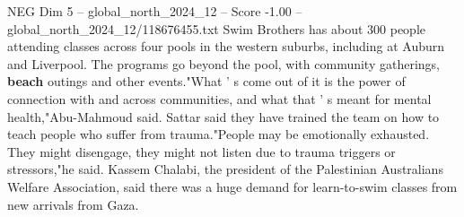 \begin{textsample}{NEG Dim 5 – global\_north\_2024\_12 – Score -1.00 – global\_north\_2024\_12/118676455.txt}
Swim Brothers has about 300 people attending classes across four pools in the western suburbs, including at Auburn and Liverpool.
The programs go beyond the pool, with community gatherings, \textbf{beach} outings and other events."What ' s come out of it is the power of connection with and across communities, and what that ' s meant for mental health,"Abu-Mahmoud said.
Sattar said they have trained the team on how to teach people who suffer from trauma."People may be emotionally exhausted.
They might disengage, they might not listen due to trauma triggers or stressors,"he said.
Kassem Chalabi, the president of the Palestinian Australians Welfare Association, said there was a huge demand for learn-to-swim classes from new arrivals from Gaza.

\end{textsample}
